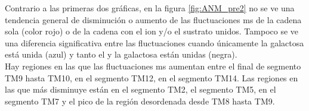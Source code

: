 Contrario a las  primeras dos gr\'{a}ficas, en la figura \ref{fig:ANM_pre2} no se ve una tendencia general de disminuci\'{o}n o aumento de las fluctuaciones ms de la cadena sola (color rojo) o de la cadena con el ion y/o el sustrato unidos. Tampoco se ve una diferencia significativa entre las fluctuaciones cuando \'{u}nicamente la galactosa est\'{a} unida (azul) y tanto el  y la galactosa est\'{a}n unidas (negra).\\

Hay regiones en las que las fluctuaciones ms aumentan entre el final de segmento TM9 hasta TM10, en el segmento TM12, en el segmento TM14. Las regiones en las que m\'{a}s disminuye est\'{a}n en el segmento TM2, el segmento TM5, en el segmento TM7 y el pico de la regi\'{o}n desordenada desde TM8 hasta TM9.\\

